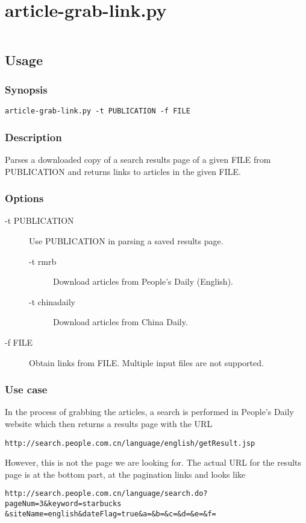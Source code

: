 \appendix
\chapter{article-grab-link.py}\label{appdx:grab-link}

\inputminted[linenos]{python}{data/script/article-grab-link.py}

\section{Usage}

\subsection{Synopsis}

\texttt{article-grab-link.py -t PUBLICATION -f FILE}

\subsection{Description}

Parses a downloaded copy of a search results page of a given FILE from
PUBLICATION and returns links to articles in the given FILE.

\subsection{Options}

\begin{description}
	\item [-t PUBLICATION] Use PUBLICATION in parsing a saved results page.
	\begin{description}
		\item [-t rmrb] Download articles from People's Daily (English).
		\item [-t chinadaily] Download articles from China Daily.
	\end{description}
	\item [-f FILE] Obtain links from FILE. Multiple input files are not
	supported.
\end{description}

\subsection{Use case}

In the process of grabbing the articles, a search is performed in People's Daily
website which then returns a results page with the URL
\begin{verbatim}
http://search.people.com.cn/language/english/getResult.jsp
\end{verbatim}
However, this is not the page we are looking for. The actual URL for the results
page is at the bottom part, at the pagination links and looks like
\begin{verbatim}
http://search.people.com.cn/language/search.do?pageNum=3&keyword=starbucks
&siteName=english&dateFlag=true&a=&b=&c=&d=&e=&f=
\end{verbatim}

